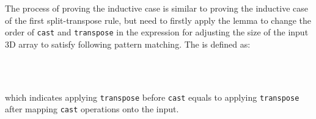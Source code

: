 \documentclass{l4proj}
\begin{document}
The process of proving the inductive case is similar to proving the inductive case of the first split-transpose rule, but need to firstly apply the lemma  to change the order of \texttt{cast} and \texttt{transpose} in the expression for adjusting the size of the input 3D array to satisfy following pattern matching. The  is defined as:
\begin{code}%
\>[0]\AgdaSpace{}%
\AgdaSymbol{:}%
\>[166I]\AgdaSymbol{\{}\AgdaSpace{}%
\AgdaSpace{}%
\AgdaSpace{}%
\AgdaSymbol{:}\AgdaSpace{}%
\AgdaSymbol{\}}\AgdaSpace{}%
\AgdaSpace{}%
\AgdaSymbol{\{}\AgdaSpace{}%
\AgdaSymbol{:}\AgdaSpace{}%
\AgdaSymbol{\}}\AgdaSpace{}%
\<%
\\
\>[.][@{}l@{}]\<[166I]%
\>[17]\AgdaSpace{}%
\AgdaSymbol{:}\AgdaSpace{}%
\AgdaSpace{}%
\AgdaSpace{}%
\AgdaSymbol{)}\AgdaSpace{}%
\AgdaSpace{}%
\AgdaSymbol{(}\AgdaSpace{}%
\AgdaSymbol{:}\AgdaSpace{}%
\AgdaSpace{}%
\AgdaSymbol{(}\AgdaSpace{}%
\AgdaSpace{}%
\AgdaSymbol{)}\AgdaSpace{}%
\AgdaSymbol{)}\AgdaSpace{}%
\<%
\\
%
\>[17]\AgdaSpace{}%
\AgdaSpace{}%
\AgdaSymbol{(}\AgdaSpace{}%
\AgdaSymbol{)}\AgdaSpace{}%
\AgdaSpace{}%
\AgdaSpace{}%
\AgdaSymbol{(}\AgdaSpace{}%
\AgdaSymbol{(}\AgdaSpace{}%
\AgdaSymbol{)}\AgdaSpace{}%
\AgdaSymbol{)}\<%
\end{code}
which indicates applying \texttt{transpose} before \texttt{cast} equals to applying \texttt{transpose} after mapping \texttt{cast} operations onto the input.
\end{document}
